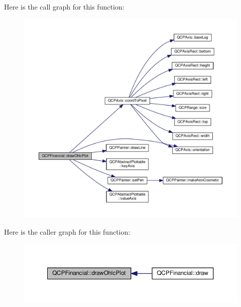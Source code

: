 Here is the call graph for this function\+:\nopagebreak
\begin{figure}[H]
\begin{center}
\leavevmode
\includegraphics[width=350pt]{class_q_c_p_financial_a3c3007a7434e29d042c77ccf4f497e66_cgraph}
\end{center}
\end{figure}




Here is the caller graph for this function\+:\nopagebreak
\begin{figure}[H]
\begin{center}
\leavevmode
\includegraphics[width=350pt]{class_q_c_p_financial_a3c3007a7434e29d042c77ccf4f497e66_icgraph}
\end{center}
\end{figure}


\hypertarget{class_q_c_p_financial_acc747f4a9b4fddfb14eb9d803349a534}{}
